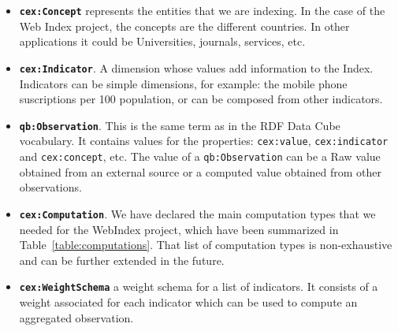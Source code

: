 \begin{itemize}
\item\textbf{\lstinline|cex:Concept|} represents the entities that we are
indexing.
In the case of the Web Index project, the concepts are the different countries.
In other applications it could be Universities, journals, services, etc.

\item\textbf{\lstinline|cex:Indicator|}. A dimension whose values add
information to the Index.
Indicators can be simple dimensions, for example: the mobile phone
suscriptions per 100 population, or can be composed from other
indicators. 

\item\textbf{\lstinline|qb:Observation|}. This is the same term as in the 
RDF Data Cube vocabulary. It contains values for the
properties: \lstinline|cex:value|, \lstinline|cex:indicator| 
and \lstinline|cex:concept|, etc. 
The value of a \lstinline|qb:Observation| can be a Raw value
   obtained from an external source or a computed value obtained from other
   observations.

\item\textbf{\lstinline|cex:Computation|}. We have declared the main computation
types that we needed for the WebIndex project, which have been summarized in
Table~\ref{table:computations}. That list of computation types is non-exhaustive
and can be further extended in the future. 

\item\textbf{\lstinline|cex:WeightSchema|} a weight schema for a list of
indicators. It consists of a weight associated for each indicator which can be
used to compute an aggregated observation.

\end{itemize}


